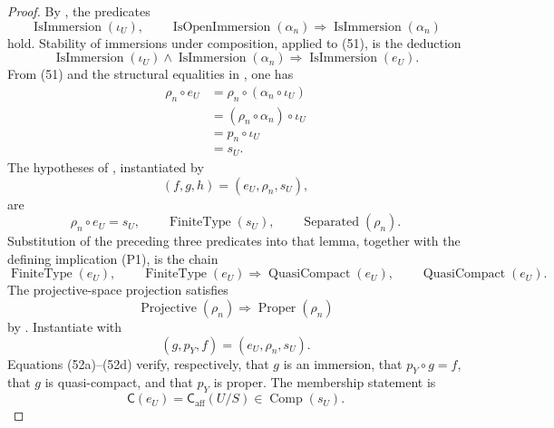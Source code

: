 \begin{proof}
  By , the predicates
  \[
    \operatorname{IsImmersion}(\iota_U),
    \qquad
    \operatorname{IsOpenImmersion}(\alpha_n)
      \Longrightarrow\operatorname{IsImmersion}(\alpha_n)
  \]
  hold.  Stability of immersions under composition, applied to (51), is the
  deduction
  \[
    \operatorname{IsImmersion}(\iota_U)
      \wedge\operatorname{IsImmersion}(\alpha_n)
      \Longrightarrow
    \operatorname{IsImmersion}(e_U).                              \tag{52a}
  \]
  From (51) and the structural equalities in
  , one has
  \[
  \begin{aligned}
    \rho_n\circ e_U
      &=\rho_n\circ(\alpha_n\circ\iota_U)\\
      &=(\rho_n\circ\alpha_n)\circ\iota_U\\
      &=p_n\circ\iota_U\\
      &=s_U.
  \end{aligned}                                                   \tag{52b}
  \]
  The hypotheses of
  , instantiated by
  \[
    (f,g,h)=(e_U,\rho_n,s_U),
  \]
  are
  \[
    \rho_n\circ e_U=s_U,\qquad
    \operatorname{FiniteType}(s_U),\qquad
    \operatorname{Separated}(\rho_n).
  \]
  Substitution of the preceding three predicates into that lemma, together
  with the defining implication (P1), is the chain
  \[
    \operatorname{FiniteType}(e_U),
    \qquad
    \operatorname{FiniteType}(e_U)
      \Longrightarrow\operatorname{QuasiCompact}(e_U),
    \qquad
    \operatorname{QuasiCompact}(e_U).                             \tag{52c}
  \]
  The projective-space projection satisfies
  \[
    \operatorname{Projective}(\rho_n)
      \Longrightarrow\operatorname{Proper}(\rho_n)               \tag{52d}
  \]
  by
  \cite[\href{https://stacks.math.columbia.edu/tag/01WC}{Tag 01WC}]
  {stacks-project}.  Instantiate
   with
  \[
    (g,p_Y,f)=(e_U,\rho_n,s_U).
  \]
  Equations (52a)--(52d) verify, respectively, that $g$ is an immersion,
  that $p_Y\circ g=f$, that $g$ is quasi-compact, and that $p_Y$ is proper.
  The membership statement is
  \[
    \mathsf C(e_U)=\mathsf C_{\mathrm{aff}}(U/S)
      \in\operatorname{Comp}(s_U).
  \]
\end{proof}

